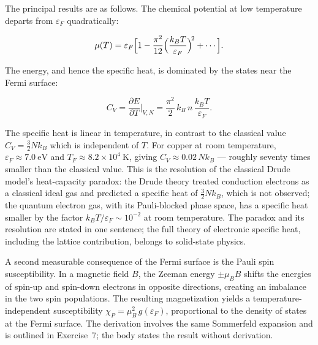 The principal results are as follows. The chemical potential at low temperature departs from $\varepsilon_F$ quadratically:
\begin{linenomath}
    \begin{equation*}
        \mu(T) = \varepsilon_F\Bigl[1 - \frac{\pi^2}{12}\Bigl(\frac{k_B T}{\varepsilon_F}\Bigr)^{\!2} + \cdots\Bigr].
    \end{equation*}
\end{linenomath}
The energy, and hence the specific heat, is dominated by the states near the Fermi surface:
\begin{linenomath}
    \begin{equation}
        C_V = \frac{\partial E}{\partial T}\bigg|_{V,N}
            = \frac{\pi^2}{2}\,k_B\,n\,\frac{k_B T}{\varepsilon_F}.
    \end{equation}
\end{linenomath}
The specific heat is linear in temperature, in contrast to the classical value $C_V = \frac{3}{2} N k_B$ which is independent of $T$. For copper at room temperature, $\varepsilon_F \approx 7.0\ \text{eV}$ and $T_F \approx 8.2 \times 10^4\ \text{K}$, giving $C_V \approx 0.02\,N k_B$ --- roughly seventy times smaller than the classical value. This is the resolution of the classical Drude model's heat-capacity paradox: the Drude theory treated conduction electrons as a classical ideal gas and predicted a specific heat of $\frac{3}{2}N k_B$, which is not observed; the quantum electron gas, with its Pauli-blocked phase space, has a specific heat smaller by the factor $k_B T/\varepsilon_F \sim 10^{-2}$ at room temperature. The paradox and its resolution are stated in one sentence; the full theory of electronic specific heat, including the lattice contribution, belongs to solid-state physics.

A second measurable consequence of the Fermi surface is the Pauli spin susceptibility. In a magnetic field $B$, the Zeeman energy $\pm \mu_B B$ shifts the energies of spin-up and spin-down electrons in opposite directions, creating an imbalance in the two spin populations. The resulting magnetization yields a temperature-independent susceptibility $\chi_P = \mu_B^2\,g(\varepsilon_F)$, proportional to the density of states at the Fermi surface. The derivation involves the same Sommerfeld expansion and is outlined in Exercise~7; the body states the result without derivation.


